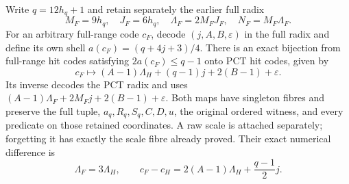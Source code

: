 \begin{theorem}
Write \(q=12h_q+1\) and retain separately the earlier full radix
\[
 M_F=9h_q,\quad J_F=6h_q,\quad\Lambda_F=2M_FJ_F,
 \quad N_F=M_F\Lambda_F.
\]
For an arbitrary full-range code \(c_F\), decode
\((j,A,B,\varepsilon)\) in the full radix and define its own
shell \(a(c_F)=(q+4j+3)/4\).
There is an exact bijection from full-range hit codes satisfying
\(2a(c_F)\le q-1\) onto PCT hit codes, given by
\[
 c_F\longmapsto(A-1)\Lambda_H+(q-1)j+2(B-1)+\varepsilon.
\]
Its inverse decodes the PCT radix and
uses \((A-1)\Lambda_F+2M_Fj+2(B-1)+\varepsilon\).
Both maps have singleton fibres and preserve the full tuple,
\(a_q,R_q,S_q,C,D,u\), the original ordered witness, and every
predicate on those retained coordinates.  A raw scale is attached
separately; forgetting it has exactly the scale fibre already proved.
Their exact numerical difference is
\[
 \Lambda_F=3\Lambda_H,\qquad
 c_F-c_H=2(A-1)\Lambda_H+\frac{q-1}{2}j.
\]
\end{theorem}
